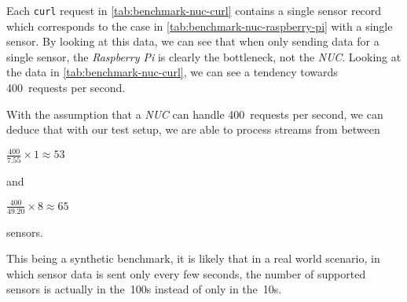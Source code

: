 Each \texttt{curl} request in \autoref{tab:benchmark-nuc-curl} contains a single sensor record which
corresponds to the case in \autoref{tab:benchmark-nuc-raspberry-pi} with a single sensor. By looking
at this data, we can see that when only sending data for a single sensor, the \textit{Raspberry Pi} is
clearly the bottleneck, not the \textit{NUC}. Looking at the data in \autoref{tab:benchmark-nuc-curl},
we can see a tendency towards 400~requests per second.

With the assumption that a \textit{NUC} can handle 400~requests per second, we can deduce that with
our test setup, we are able to process streams from between

$\frac{400}{7.55} \times 1 \approx 53$

and

$\frac{400}{49.20} \times 8 \approx 65$

sensors.

This being a synthetic benchmark, it is likely that in a real world scenario, in which sensor data is
sent only every few seconds, the number of supported sensors is actually in the~100s instead
of only in the~10s.
